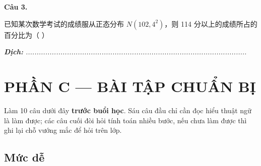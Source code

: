 \documentclass[11pt, a4paper]{article}
\begin{document}
\textbf{Câu 3.}

已知某次数学考试的成绩服从正态分布 $N(102, 4^2)$，则 114 分以上的成绩所占的百分比为（ ）

\noindent\emph{\textbf{Dịch:} ......................................................................................................}

\section{PHẦN C — BÀI TẬP CHUẨN BỊ}

Làm 10 câu dưới đây \textbf{trước buổi học}. Sáu câu đầu chỉ cần đọc hiểu thuật ngữ là làm được; các câu cuối đòi hỏi tính toán nhiều bước, nếu chưa làm được thì ghi lại chỗ vướng mắc để hỏi trên lớp.

\subsection{Mức dễ}
\end{document}
